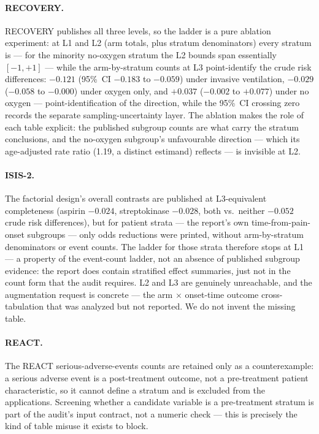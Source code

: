 \documentclass[article]{ajs}
\begin{document}
\paragraph{RECOVERY.} RECOVERY publishes all three levels, so the ladder
is a pure ablation experiment: at L1 and L2 (arm totals, plus stratum
denominators) every stratum is  --- for the minority
no-oxygen stratum the L2 bounds span essentially $[-1,+1]$ --- while the
arm-by-stratum counts at L3 point-identify the crude risk differences:
$-0.121$ (95\%~CI $-0.183$ to $-0.059$) under invasive ventilation,
$-0.029$ ($-0.058$ to $-0.000$) under oxygen only, and $+0.037$
($-0.002$ to $+0.077$) under no oxygen --- point-identification of the
direction, while the 95\%~CI crossing zero records the separate
sampling-uncertainty layer. The ablation makes the role of
each table explicit: the published subgroup counts are what carry the
stratum conclusions, and the no-oxygen subgroup's unfavourable direction
--- which its age-adjusted rate ratio (1.19, a distinct estimand)
reflects --- is invisible at L2.

\paragraph{ISIS-2.} The factorial design's overall contrasts are
published at L3-equivalent completeness (aspirin $-0.024$, streptokinase
$-0.028$, both vs.\ neither $-0.052$ crude risk differences), but for
patient strata --- the report's own time-from-pain-onset subgroups ---
only odds reductions were printed, without arm-by-stratum denominators
or event counts. The ladder for those strata therefore stops at L1 ---
a property of the event-count ladder, not an absence of published
subgroup evidence: the report does contain stratified effect summaries,
just not in the count form that the audit requires. L2 and L3 are
genuinely unreachable, and the augmentation request is
concrete --- the arm $\times$ onset-time outcome cross-tabulation that
was analyzed but not reported. We do not invent the missing table.

\paragraph{REACT.} The REACT serious-adverse-events counts are retained
only as a counterexample: a serious adverse event is a post-treatment
outcome, not a pre-treatment patient characteristic, so it cannot define
a stratum and is excluded from the applications. Screening whether a
candidate variable is a pre-treatment stratum is part of the audit's
input contract, not a numeric check --- this is precisely the kind of
table misuse it exists to block.
\end{document}
